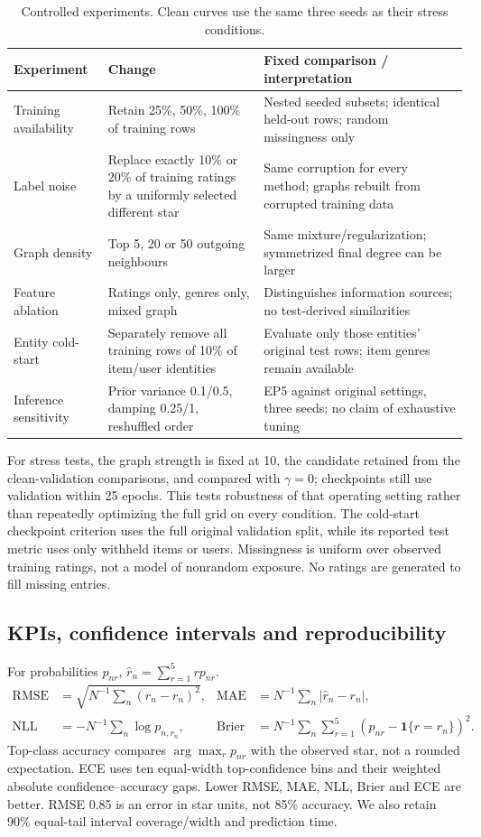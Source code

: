 \begin{table}[!htbp]\centering\small
\begin{tabularx}{\linewidth}{@{}lXX@{}}\toprule
Experiment & Change & Fixed comparison / interpretation\\\midrule
Training availability & Retain 25\%, 50\%, 100\% of training rows & Nested seeded subsets; identical held-out rows; random missingness only\\
Label noise & Replace exactly 10\% or 20\% of training ratings by a uniformly selected different star & Same corruption for every method; graphs rebuilt from corrupted training data\\
Graph density & Top 5, 20 or 50 outgoing neighbours & Same mixture/regularization; symmetrized final degree can be larger\\
Feature ablation & Ratings only, genres only, mixed graph & Distinguishes information sources; no test-derived similarities\\
Entity cold-start & Separately remove all training rows of 10\% of item/user identities & Evaluate only those entities' original test rows; item genres remain available\\
Inference sensitivity & Prior variance 0.1/0.5, damping 0.25/1, reshuffled order & EP5 against original settings, three seeds; no claim of exhaustive tuning\\\bottomrule
\end{tabularx}
\caption{Controlled experiments. Clean curves use the same three seeds as their stress conditions.}
\end{table}

For stress tests, the graph strength is fixed at 10, the candidate retained from
the clean-validation comparisons, and compared with $\gamma=0$; checkpoints
still use validation within 25 epochs. This tests robustness of that operating
setting rather than repeatedly optimizing the full grid on every condition.
The cold-start checkpoint criterion uses the full original validation
split, while its reported test metric uses only withheld items or users.
Missingness is uniform over observed training ratings, not a model of
nonrandom exposure. No ratings are generated to fill missing entries.

\subsection{KPIs, confidence intervals and reproducibility}
For probabilities $p_{nr}$, $\hat r_n=\sum_{r=1}^5rp_{nr}$.
\begin{align}
\mathrm{RMSE}&=\sqrt{N^{-1}\sum_n(\hat r_n-r_n)^2},&
\mathrm{MAE}&=N^{-1}\sum_n|\hat r_n-r_n|,\\
\mathrm{NLL}&=-N^{-1}\sum_n\log p_{n,r_n},&
\mathrm{Brier}&=N^{-1}\sum_n\sum_{r=1}^5(p_{nr}-\mathbf1\{r=r_n\})^2.
\end{align}
Top-class accuracy compares $\arg\max_r p_{nr}$ with the observed star, not a
rounded expectation. ECE uses ten equal-width top-confidence bins and their
weighted absolute confidence--accuracy gaps. Lower RMSE, MAE, NLL, Brier and
ECE are better. RMSE 0.85 is an error in star units, not 85\% accuracy.
We also retain 90\% equal-tail interval coverage/width and prediction time.

